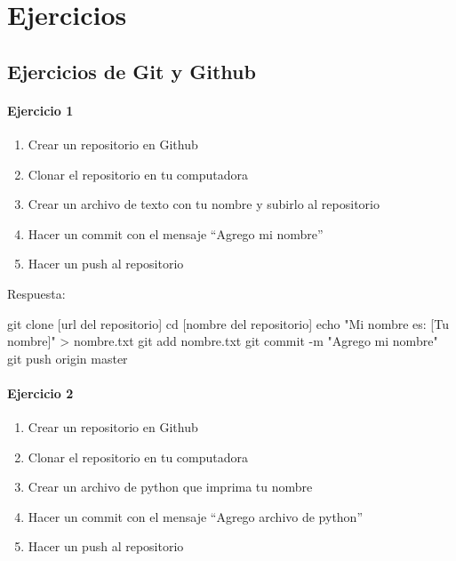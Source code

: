 \documentclass[
  a4paper,
  DIV=11,
  numbers=noendperiod,
  onepage,
  openany]{scrreprt}
\newenvironment{Shaded}{\begin{snugshade}}{\end{snugshade}}
\newcommand{\AttributeTok}[1]{\textcolor[rgb]{0.40,0.45,0.13}{#1}}
\newcommand{\BuiltInTok}[1]{\textcolor[rgb]{0.00,0.23,0.31}{#1}}
\newcommand{\FunctionTok}[1]{\textcolor[rgb]{0.28,0.35,0.67}{#1}}
\newcommand{\NormalTok}[1]{\textcolor[rgb]{0.00,0.23,0.31}{#1}}
\newcommand{\OperatorTok}[1]{\textcolor[rgb]{0.37,0.37,0.37}{#1}}
\newcommand{\StringTok}[1]{\textcolor[rgb]{0.13,0.47,0.30}{#1}}
\providecommand{\tightlist}{%
  \setlength{\itemsep}{0pt}\setlength{\parskip}{0pt}}\usepackage{longtable,booktabs,array}
\begin{document}
\part{Ejercicios}

\chapter{Ejercicios de Git y Github}\label{ejercicios-de-git-y-github}

\subsection{Ejercicio 1}\label{ejercicio-1-1}

\begin{enumerate}
\def\labelenumi{\arabic{enumi}.}
\tightlist
\item
  Crear un repositorio en Github
\item
  Clonar el repositorio en tu computadora
\item
  Crear un archivo de texto con tu nombre y subirlo al repositorio
\item
  Hacer un commit con el mensaje ``Agrego mi nombre''
\item
  Hacer un push al repositorio
\end{enumerate}

Respuesta:

\begin{Shaded}
\begin{Highlighting}[]
\FunctionTok{git}\NormalTok{ clone [url del repositorio]}
\BuiltInTok{cd}\NormalTok{ [nombre del repositorio]}
\BuiltInTok{echo} \StringTok{"Mi nombre es: [Tu nombre]"} \OperatorTok{\textgreater{}}\NormalTok{ nombre.txt}
\FunctionTok{git}\NormalTok{ add nombre.txt}
\FunctionTok{git}\NormalTok{ commit }\AttributeTok{{-}m} \StringTok{"Agrego mi nombre"}
\FunctionTok{git}\NormalTok{ push origin master}
\end{Highlighting}
\end{Shaded}

\subsection{Ejercicio 2}\label{ejercicio-2}

\begin{enumerate}
\def\labelenumi{\arabic{enumi}.}
\tightlist
\item
  Crear un repositorio en Github
\item
  Clonar el repositorio en tu computadora
\item
  Crear un archivo de python que imprima tu nombre
\item
  Hacer un commit con el mensaje ``Agrego archivo de python''
\item
  Hacer un push al repositorio
\end{enumerate}
\end{document}
